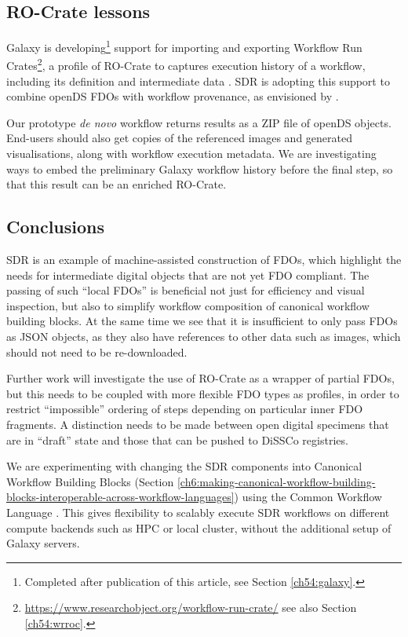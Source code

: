 \subsection{RO-Crate lessons}\label{ch7:ro-crate-lessons}

Galaxy is developing\footnote{
    Completed after publication of this article, see Section \vref{ch54:galaxy}.
} support for importing and
exporting Workflow
Run Crates\footnote{\url{https://www.researchobject.org/workflow-run-crate/} see also Section \vref{ch54:wrroc}.}, a profile of RO-Crate \cite{Soiland-Reyes 2022a} to
captures execution history of a workflow, including its definition and
intermediate data \cite{De Geest 2022}. SDR is adopting this support to
combine openDS FDOs with workflow provenance, as envisioned by
\cite{Walton 2020a}.

Our prototype \emph{de novo} workflow returns results as a \gls{ZIP} file of
openDS objects. End-users should also get copies of the referenced
images and generated visualisations, along with workflow execution
metadata. We are investigating ways to embed the preliminary Galaxy
workflow history before the final step, so that this result can be an
enriched RO-Crate.

\subsection{Conclusions}\label{ch7:conclusions}

SDR is an example of machine-assisted construction of FDOs, which
highlight the needs for intermediate digital objects that are not yet
FDO compliant. The passing of such ``local FDOs'' is beneficial not just
for efficiency and visual inspection, but also to simplify workflow
composition of canonical workflow building blocks. At the same time we
see that it is insufficient to only pass FDOs as JSON objects, as they
also have references to other data such as images, which should not need
to be re-downloaded.

Further work will investigate the use of RO-Crate as a wrapper of
partial FDOs, but this needs to be coupled with more flexible FDO types
as profiles, in order to restrict ``impossible'' ordering of steps
depending on particular inner FDO fragments. A distinction needs to be
made between open digital specimens that are in ``draft'' state and
those that can be pushed to \acrshort{DiSSCo} registries.

We are experimenting with changing the SDR components into Canonical
Workflow Building Blocks \cite{Soiland-Reyes 2022b}
(Section \vref{ch6:making-canonical-workflow-building-blocks-interoperable-across-workflow-languages}) 
using the Common Workflow Language \cite{Crusoe 2022}. This gives
flexibility to scalably execute SDR workflows on different compute
backends such as HPC or local cluster, without the additional setup of
Galaxy servers.

